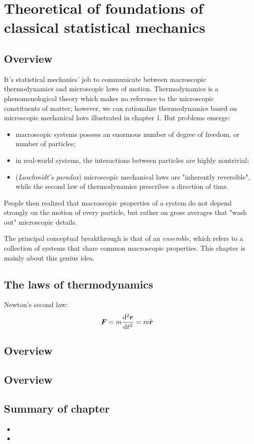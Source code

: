 
\chapter{Theoretical of foundations of classical statistical mechanics}

\section{Overview}

It's statistical mechanics' job to communicate between macroscopic thermodynamics and microscopic laws of motion. Thermodynamics is a phenomenological theory which makes no reference to the microscopic constituents of matter; however, we can rationalize thermodynamics based on microscopic mechanical laws illustrated in chapter 1. But problems emerge:
\begin{itemize}
	\item macroscopic systems possess an enormous number of degree of freedom, or number of particles;
	\item in real-world systems, the interactions between particles are highly nontrivial;
	\item (\textit{Loschmidt's paradox}) microscopic mechanical laws are "inherently reversible", while the second law of thermodynamics prescribes a direction of time.
\end{itemize}
People then realized that macroscopic properties of a system do not depend strongly on the motion of every particle, but rather on gross averages that "wash out" microscopic details. 

The principal conceptual breakthrough is that of an \textit{ensemble}, which refers to a collection of systems that share common macroscopic properties. This chapter is mainly about this genius idea.

\section{The laws of thermodynamics}

Newton's second law:
\begin{equation}
	\boldsymbol{F}=m\dfrac{\mathrm{d}^2 \boldsymbol{r}}{\mathrm{d} t^2}=m\ddot{\boldsymbol{r}} 
\end{equation}

\section{Overview}



\section{Overview}


\section*{Summary of chapter}

\begin{itemize}
	\item 
	\item 
\end{itemize}